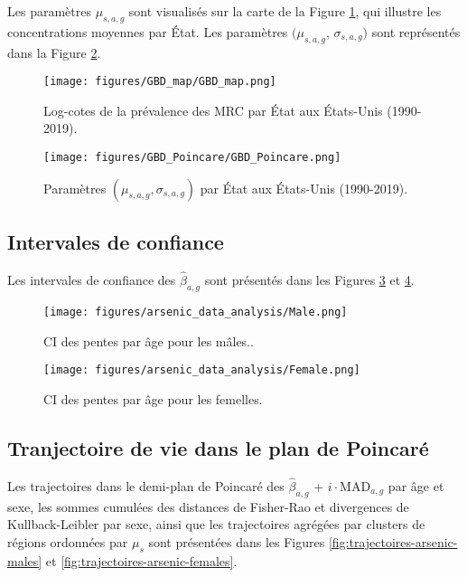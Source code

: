 Les paramètres $\mu_{s,a,g}$ sont visualisés sur la carte de la Figure \ref{fig:GBD-map}, qui illustre les concentrations moyennes par État. Les paramètres $(\mu_{s,a,g}$, $\sigma_{s,a,g})$ sont représentés dans la Figure \ref{fig:GBD_Poincare}.

\begin{figure}[H]
	\centering
	\texttt{[image: figures/GBD\_map/GBD\_map.png]}
	\caption{Log-cotes de la prévalence des MRC par État aux États-Unis (1990-2019).}
	\label{fig:GBD-map}
\end{figure}

\begin{figure}[H]
	\centering
	\texttt{[image: figures/GBD\_Poincare/GBD\_Poincare.png]}
	\caption{Paramètres $(\mu_{s,a,g}, \sigma_{s,a,g})$ par État aux États-Unis (1990-2019).}
	\label{fig:GBD_Poincare}
\end{figure}

\subsection{Intervales de confiance}

Les intervales de confiance des $\hat{\beta}_{a,g}$ sont présentés dans les Figures \ref{fig:CI-arsenic-males} et \ref{fig:CI-arsenic-females}.

\begin{figure}[H]
	\centering
	\texttt{[image: figures/arsenic\_data\_analysis/Male.png]}
	\caption{CI des pentes par âge pour les mâles..}
	\label{fig:CI-arsenic-males}
\end{figure}

\begin{figure}[H]
	\centering
	\texttt{[image: figures/arsenic\_data\_analysis/Female.png]}
	\caption{CI des pentes par âge pour les femelles.}
	\label{fig:CI-arsenic-females}
\end{figure}

\subsection{Tranjectoire de vie dans le plan de Poincaré}

Les trajectoires dans le demi-plan de Poincaré des $\hat{\beta}_{a,g}$ + $i \cdot \mathrm{MAD}_{a,g}$ par âge et sexe, les sommes cumulées des distances de Fisher-Rao et divergences de Kullback-Leibler par sexe, ainsi que les trajectoires agrégées par clusters de régions ordonnées par $\mu_s$ sont présentées dans les Figures \ref{fig:trajectoires-arsenic-males} et \ref{fig:trajectoires-arsenic-females}.

